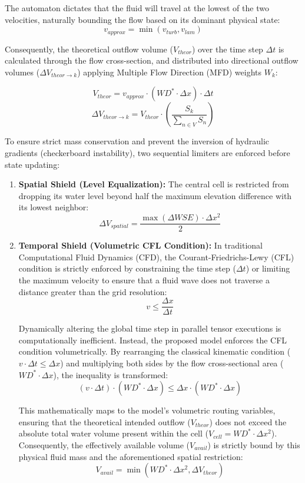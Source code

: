 The automaton dictates that the fluid will travel at the lowest of the two velocities, naturally bounding the flow based on its 
dominant physical state:
$$v_{approx} = \min(v_{turb}, v_{lam})$$

Consequently, the theoretical outflow volume ($V_{theor}$) over the time step $\Delta t$ is calculated through the flow 
cross-section, and distributed into directional outflow volumes ($\Delta V_{theor \rightarrow k}$) applying Multiple Flow 
Direction (MFD) weights $W_k$:

$$V_{theor} = v_{approx} \cdot (WD^* \cdot \Delta x) \cdot \Delta t$$
$$\Delta V_{theor \rightarrow k} = V_{theor} \cdot \left( \frac{S_k}{\sum_{n \in V} S_n} \right)$$

To ensure strict mass conservation and prevent the inversion of hydraulic gradients (checkerboard instability), two sequential 
limiters are enforced before state updating:

\begin{enumerate}
    \item \textbf{Spatial Shield (Level Equalization):} The central cell is restricted from dropping its water level beyond half 
    the maximum elevation difference with its lowest neighbor:
    $$\Delta V_{spatial} = \frac{\max(\Delta WSE) \cdot \Delta x^2}{2}$$

    \item \textbf{Temporal Shield (Volumetric CFL Condition):} In traditional Computational Fluid Dynamics (CFD), the 
    Courant-Friedrichs-Lewy (CFL) condition is strictly enforced by constraining the time step ($\Delta t$) or limiting the 
    maximum velocity to ensure that a fluid wave does not traverse a distance greater than the grid resolution:
    $$v \le \frac{\Delta x}{\Delta t}$$
    
    Dynamically altering the global time step in parallel tensor executions is computationally inefficient. Instead, the 
    proposed model enforces the CFL condition volumetrically. By rearranging the classical kinematic condition 
    ($v \cdot \Delta t \le \Delta x$) and multiplying both sides by the flow cross-sectional area ($WD^* \cdot \Delta x$), 
    the inequality is transformed:
    $$(v \cdot \Delta t) \cdot (WD^* \cdot \Delta x) \le \Delta x \cdot (WD^* \cdot \Delta x)$$
    
    This mathematically maps to the model's volumetric routing variables, ensuring that the theoretical intended outflow 
    ($V_{theor}$) does not exceed the absolute total water volume present within the cell ($V_{cell} = WD^* \cdot \Delta x^2$). 
    Consequently, the effectively available volume ($V_{avail}$) is strictly bound by this physical fluid mass and the 
    aforementioned spatial restriction:
    $$V_{avail} = \min(WD^* \cdot \Delta x^2, \Delta V_{theor})$$
\end{enumerate}

